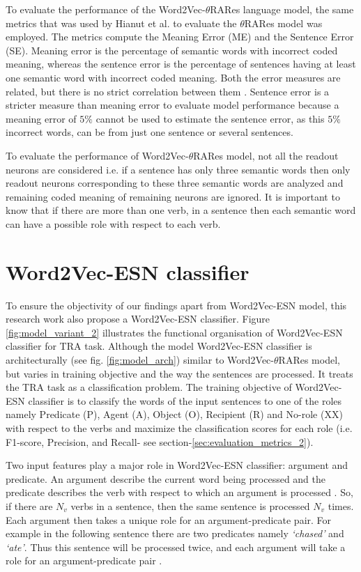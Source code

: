 To evaluate the performance of the Word2Vec-$\theta$RARes language model, the same metrics that was used by Hianut et al. \cite{xavier:2013:RT} to evaluate the $\theta$RARes model was employed. The metrics compute the Meaning Error (ME) and the Sentence Error (SE). Meaning error is the percentage of semantic words with incorrect coded meaning, whereas the sentence error is the percentage of sentences having at least one semantic word with incorrect coded meaning. Both the error measures are related, but there is no strict correlation between them \cite{xavier:2013:RT}. Sentence error is a stricter measure than meaning error to evaluate model performance because a meaning error of $5\%$ cannot be used to estimate the sentence error, as this $5 \%$ incorrect words, can be from just one sentence or several sentences. 

To evaluate the performance of Word2Vec-$\theta$RARes model, not all the readout neurons are considered i.e. if a sentence has only three semantic words then only readout neurons corresponding to these three semantic words are analyzed \cite{xavier:2013:RT} and remaining coded meaning of remaining neurons are ignored. It is important to know that if there are more than one verb, in a sentence then each semantic word can have a possible role with respect to each verb. 

\section{Word2Vec-ESN classifier}\label{sec:model_variant}

To ensure the objectivity of our findings apart from Word2Vec-ESN model, this research work also propose a Word2Vec-ESN classifier. Figure \ref{fig:model_variant_2} illustrates the functional organisation of Word2Vec-ESN classifier for TRA task. Although the model Word2Vec-ESN classifier is architecturally (see fig. \ref{fig:model_arch}) similar to Word2Vec-$\theta$RARes model, but varies in training objective and the way the sentences are processed. It treats the TRA task as a classification problem. The training objective of Word2Vec-ESN classifier is to classify the words of the input sentences to one of the roles namely Predicate (P), Agent (A), Object (O), Recipient (R) and No-role (XX) with respect to the verbs and maximize the classification scores for each role (i.e. F1-score, Precision, and Recall- see section-\ref{sec:evaluation_metrics_2}).

Two input features play a major role in Word2Vec-ESN classifier: argument and predicate. An argument describe the current word being processed and the predicate describes the verb with respect to which an argument is processed \cite{end-to-end}. So, if there are $N_{v}$ verbs in a sentence, then the same sentence is processed $N_{v}$ times. Each argument then takes a unique role for an argument-predicate pair. For example in the following sentence there are two predicates namely \textit{`chased'} and \textit{`ate'}. Thus this sentence will be processed twice, and each argument will take a role for an argument-predicate pair \cite{end-to-end}. 

